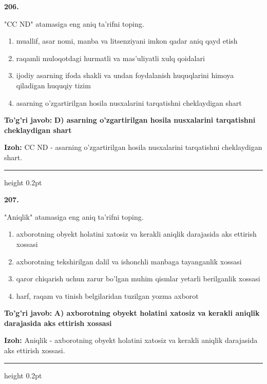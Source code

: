 \documentclass[10pt,a4paper,oneside]{article}
\begin{document}
\noindent\textbf{\color{ink}206.}
\par
"CC ND" atamasiga eng aniq ta'rifni toping.
\begin{enumerate}[label=\Alph*),leftmargin=9mm]
\item muallif, asar nomi, manba va litsenziyani imkon qadar aniq qayd etish
\item raqamli muloqotdagi hurmatli va mas'uliyatli xulq qoidalari
\item ijodiy asarning ifoda shakli va undan foydalanish huquqlarini himoya qiladigan huquqiy tizim
\item asarning o'zgartirilgan hosila nusxalarini tarqatishni cheklaydigan shart
\end{enumerate}
\begin{tcolorbox}[enhanced,breakable,colback=teal!4,colframe=teal!50!black,boxrule=0.5pt,arc=1.1mm,left=3mm,right=3mm,top=1.7mm,bottom=1.7mm,before skip=2mm,after skip=2mm]
\textbf{\color{teal}To'g'ri javob:} \textbf{D) asarning o'zgartirilgan hosila nusxalarini tarqatishni cheklaydigan shart}
\par\smallskip
\textbf{Izoh:} CC ND - asarning o'zgartirilgan hosila nusxalarini tarqatishni cheklaydigan shart.
\end{tcolorbox}
\vspace{2mm}\hrule height 0.2pt \vspace{3mm}

\noindent\textbf{\color{ink}207.}
\par
"Aniqlik" atamasiga eng aniq ta'rifni toping.
\begin{enumerate}[label=\Alph*),leftmargin=9mm]
\item axborotning obyekt holatini xatosiz va kerakli aniqlik darajasida aks ettirish xossasi
\item axborotning tekshirilgan dalil va ishonchli manbaga tayanganlik xossasi
\item qaror chiqarish uchun zarur bo'lgan muhim qismlar yetarli berilganlik xossasi
\item harf, raqam va tinish belgilaridan tuzilgan yozma axborot
\end{enumerate}
\begin{tcolorbox}[enhanced,breakable,colback=teal!4,colframe=teal!50!black,boxrule=0.5pt,arc=1.1mm,left=3mm,right=3mm,top=1.7mm,bottom=1.7mm,before skip=2mm,after skip=2mm]
\textbf{\color{teal}To'g'ri javob:} \textbf{A) axborotning obyekt holatini xatosiz va kerakli aniqlik darajasida aks ettirish xossasi}
\par\smallskip
\textbf{Izoh:} Aniqlik - axborotning obyekt holatini xatosiz va kerakli aniqlik darajasida aks ettirish xossasi.
\end{tcolorbox}
\vspace{2mm}\hrule height 0.2pt \vspace{3mm}
\end{document}
